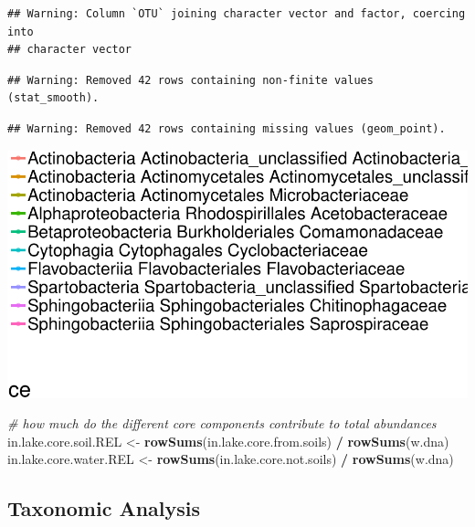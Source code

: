 \documentclass[]{article}
\newenvironment{Shaded}{\begin{snugshade}}{\end{snugshade}}
\newcommand{\KeywordTok}[1]{\textcolor[rgb]{0.13,0.29,0.53}{\textbf{#1}}}
\newcommand{\StringTok}[1]{\textcolor[rgb]{0.31,0.60,0.02}{#1}}
\newcommand{\CommentTok}[1]{\textcolor[rgb]{0.56,0.35,0.01}{\textit{#1}}}
\newcommand{\OperatorTok}[1]{\textcolor[rgb]{0.81,0.36,0.00}{\textbf{#1}}}
\newcommand{\NormalTok}[1]{#1}
\begin{document}
\begin{verbatim}
## Warning: Column `OTU` joining character vector and factor, coercing into
## character vector
\end{verbatim}

\begin{verbatim}
## Warning: Removed 42 rows containing non-finite values (stat_smooth).
\end{verbatim}

\begin{verbatim}
## Warning: Removed 42 rows containing missing values (geom_point).
\end{verbatim}

\begin{center}\includegraphics[width=0.7\linewidth]{ReservoirGradient_files/figure-latex/unnamed-chunk-11-5} \end{center}

\begin{Shaded}
\begin{Highlighting}[]
\CommentTok{# how much do the different core components contribute to total abundances}
\NormalTok{in.lake.core.soil.REL <-}\StringTok{ }\KeywordTok{rowSums}\NormalTok{(in.lake.core.from.soils) }\OperatorTok{/}\StringTok{ }\KeywordTok{rowSums}\NormalTok{(w.dna)}
\NormalTok{in.lake.core.water.REL <-}\StringTok{ }\KeywordTok{rowSums}\NormalTok{(in.lake.core.not.soils) }\OperatorTok{/}\StringTok{ }\KeywordTok{rowSums}\NormalTok{(w.dna)}
\end{Highlighting}
\end{Shaded}

\subsection{Taxonomic Analysis}\label{taxonomic-analysis}
\end{document}
